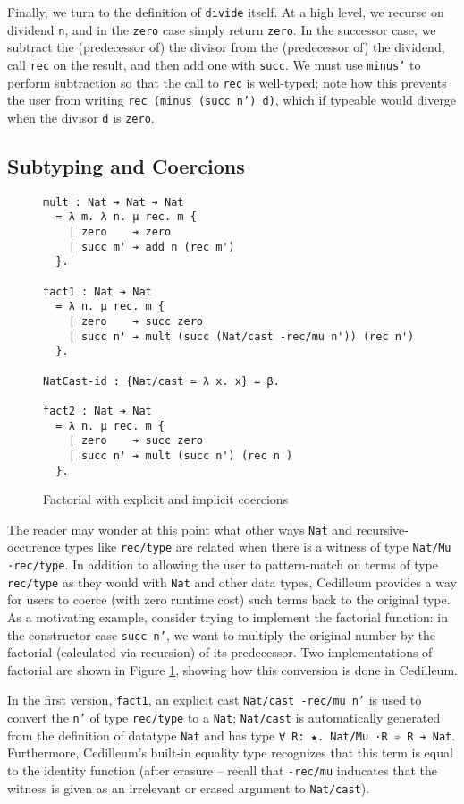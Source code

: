 \documentclass{article}
\begin{document}
Finally, we turn to the definition of \texttt{divide} itself. At a high level,
we recurse on dividend \texttt{n}, and in the \texttt{zero} case simply return
\texttt{zero}. In the successor case, we subtract the (predecessor of) the
divisor from the (predecessor of) the dividend, call \texttt{rec} on the result,
and then add one with \texttt{succ}. We must use \texttt{minus'} to perform
subtraction so that the call to \texttt{rec} is well-typed; note how this 
prevents the user from writing \texttt{rec (minus (succ n') d)}, which if
typeable would diverge when the divisor \texttt{d} is \texttt{zero}.

\subsection{Subtyping and Coercions}
\label{sec:subtyping-coercion}
\begin{figure}[h]
\begin{verbatim}
mult : Nat ➔ Nat ➔ Nat
  = λ m. λ n. μ rec. m {
    | zero    ➔ zero
    | succ m' ➔ add n (rec m')
  }.

fact1 : Nat ➔ Nat
  = λ n. μ rec. m {
    | zero    ➔ succ zero
    | succ n' ➔ mult (succ (Nat/cast -rec/mu n')) (rec n')
  }.

NatCast-id : {Nat/cast ≃ λ x. x} = β.

fact2 : Nat ➔ Nat
  = λ n. μ rec. m {
    | zero    ➔ succ zero
    | succ n' ➔ mult (succ n') (rec n')
  }.
\end{verbatim}
  \caption{Factorial with explicit and implicit coercions}
  \label{fig:ex-data-fact}
\end{figure}

The reader may wonder at this point what other ways \texttt{Nat} and
recursive-occurence types like \texttt{rec/type} are related when there is a
witness of type \texttt{Nat/Mu ·rec/type}. In addition to allowing the user to
pattern-match on terms of type \texttt{rec/type} as they would with \texttt{Nat}
and other data types, Cedilleum provides a way for users to coerce (with zero
runtime cost) such terms back to the original type. As a motivating example, consider
trying to implement the factorial function: in the constructor case \texttt{succ
n'}, we want to multiply the original number by the factorial (calculated via
recursion) of its predecessor. Two implementations of factorial are shown in
Figure \ref{fig:ex-data-fact}, showing how this conversion is done in Cedilleum.

In the first version, \texttt{fact1}, an explicit cast \texttt{Nat/cast -rec/mu n'} is used
to convert the \texttt{n'} of type \texttt{rec/type} to a \texttt{Nat};
\texttt{Nat/cast} is automatically generated from the definition of datatype
\texttt{Nat} and has type \texttt{∀ R: ★. Nat/Mu ·R ➾ R ➔ Nat}. Furthermore,
Cedilleum's built-in equality type recognizes that this term is equal to the
identity function (after erasure -- recall that \texttt{-rec/mu} inducates that
the witness is given as an irrelevant or erased argument to \texttt{Nat/cast}).
\end{document}
